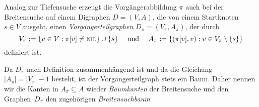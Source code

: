 \begin{bem} 
Analog zur Tiefensuche erzeugt die Vorgängerabbildung $\pi$ auch bei der Breitensuche auf einem Digraphen $D=(V,A)$, die von einem Startknoten~$s \in V$ ausgeht, einen \emph{Vorgängerteilgraphen} $D_\pi = (V_\pi,A_\pi)$, der durch
\[
V_\pi := \left\{ v \in V : \pi[v] \neq \mathop{\text{\textsc{nil}}}\right\} \cup \{s\} \quad \text{ und } \quad A_\pi := \left\{ (\pi[v],v) : v \in V_\pi \setminus \{s\}\right\}
\]
definiert ist.

Da $D_\pi$ nach Definition zusammenhängend ist und da die Gleichung $|A_\pi|=|V_\pi|-1$ besteht, ist der Vorgängerteilgraph stets ein Baum.
Daher nennen wir die Kanten in $A_\pi \subseteq A$ wieder \emph{Baumkanten} der Breitensuche und den Graphen~$D_\pi$ den zugehörigen \emph{Breitensuchbaum}.
\end{bem}

